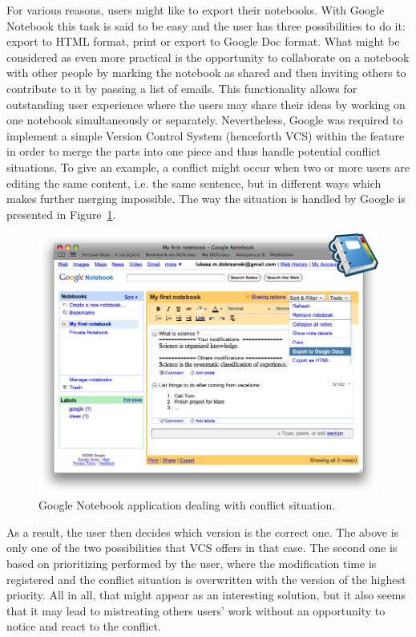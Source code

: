 For various reasons, users might like to export their notebooks. With Google Notebook this task is said to be easy and the user has three possibilities to do it: export to HTML format, print or export to Google Doc format. What might be considered as even more practical is the opportunity to collaborate on a notebook with other people by marking the notebook as shared and then inviting others to contribute to it by passing a list of emails. This functionality allows for outstanding user experience where the users may share their ideas by working on one notebook simultaneously or separately. Nevertheless, Google was required to implement a simple Version Control System (henceforth VCS) within the feature in order to merge the parts into one piece and thus handle potential conflict situations. To give an example, a conflict might occur when two or more users are editing the same content, i.e. the same sentence, but in different ways which makes further merging impossible. The way the situation is handled by Google is presented in Figure~\ref{fig:google_notebook}. 
\begin{figure}[ht]
\begin{center}
\includegraphics[scale=0.38]{img/google_notebook_demo.png}
\caption{Google Notebook application dealing with conflict situation.}
\label{fig:google_notebook}
\end{center}
\end{figure}
As a result, the user then decides which version is the correct one. The above is only one of the two possibilities that VCS offers in that case. The second one is based on prioritizing performed by the user, where the modification time is registered and the conflict situation is overwritten with the version of the highest priority. All in all, that might appear as an interesting solution, but it also seems that it may lead to mistreating others users' work without an opportunity to notice and react to the conflict.

